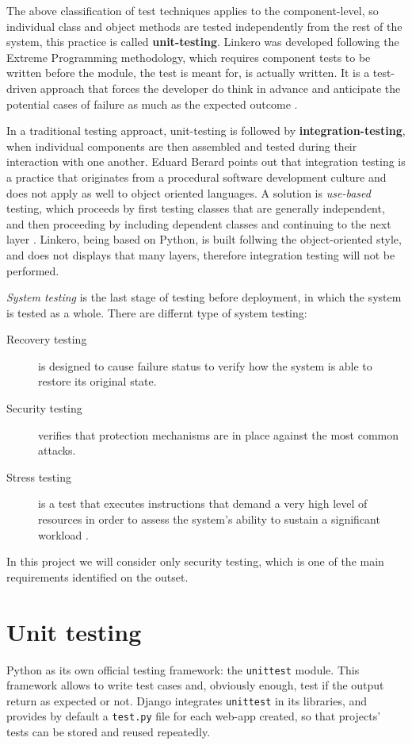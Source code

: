 The above classification of test techniques applies to the component-level, so
individual class and object methods are tested independently from the rest of
the system, this practice is called \textbf{unit-testing}. Linkero was developed
following the Extreme Programming methodology, which requires component tests to
be written before the module, the test is meant for, is actually written. It is
a test-driven approach that forces the developer do think in advance and
anticipate the potential cases of failure as much as the expected outcome
\cite{VV08}.

In a traditional testing approact, unit-testing is followed by
\textbf{integration-testing}, when individual components are then assembled and
tested during their interaction with one another. Eduard Berard points out that
integration testing is a practice that originates from a procedural software
development culture and does not apply as well to object oriented languages. A
solution is \emph{use-based} testing, which proceeds by first testing classes
that are generally independent, and then proceeding by including dependent
classes and continuing to the next layer \cite{EB93}. Linkero, being based on
Python, is built follwing the object-oriented style, and does not displays that
many layers, therefore integration testing will not be performed.

\emph{System testing} is the last stage of testing before deployment, in which
the system is tested as a whole. There are differnt type of system testing:
\begin{description}
\item[Recovery testing] is designed to cause failure status to verify how the
system is able to restore its original state.
\item[Security testing] verifies that protection mechanisms are in place against
the most common attacks.
\item[Stress testing] is a test that executes instructions that demand a very
high level of resources in order to assess the system's ability to sustain a
significant workload \cite{RP05}.
\end{description}

In this project we will consider only security testing, which is one of the main
requirements identified on the outset.


\section{Unit testing}
Python as its own official testing framework: the \texttt{unittest} module. This
framework allows to write test cases and, obviously enough, test if the output
return as expected or not. Django integrates \texttt{unittest} in its libraries,
and provides by default a \texttt{test.py} file for each web-app created, so
that projects' tests can be stored and reused repeatedly.

